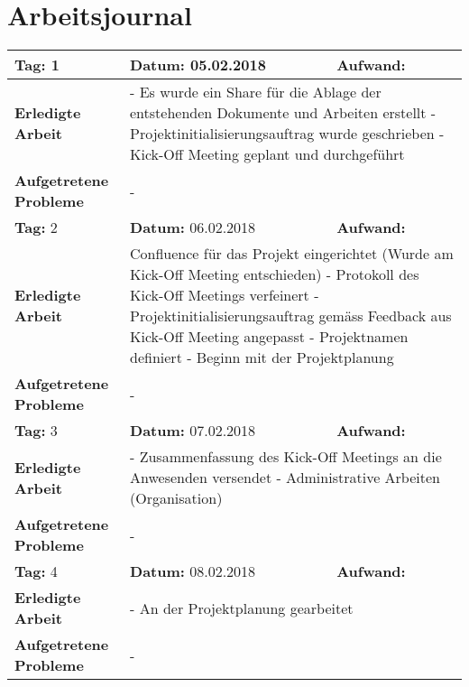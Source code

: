 \section{Arbeitsjournal}
\begin{longtable}{|p{5cm}|p{5cm}|p{6cm}|}
\hline
\rowcolor{heading}\textbf{Tag:} 1 & \textbf{Datum:} 05.02.2018 & \textbf{Aufwand:} \\ \hline
\textbf{Erledigte Arbeit} & \multicolumn{2}{p{11cm}|}{- Es wurde ein Share für die Ablage der entstehenden Dokumente und Arbeiten erstellt \newline
- Projektinitialisierungsauftrag wurde geschrieben \newline
- Kick-Off Meeting geplant und durchgeführt} \\ \hline
\textbf{Aufgetretene Probleme} & \multicolumn{2}{p{11cm}|}{-} \\ \hline
\rowcolor{heading}\textbf{Tag:} 2 & \textbf{Datum:} 06.02.2018 & \textbf{Aufwand:} \\ \hline
\textbf{Erledigte Arbeit} & \multicolumn{2}{p{11cm}|}{Confluence für das Projekt eingerichtet (Wurde am Kick-Off Meeting entschieden) \newline
- Protokoll des Kick-Off Meetings verfeinert \newline
- Projektinitialisierungsauftrag gemäss Feedback aus Kick-Off Meeting angepasst \newline
- Projektnamen definiert \newline
- Beginn mit der Projektplanung} \\ \hline
\textbf{Aufgetretene Probleme} & \multicolumn{2}{p{11cm}|}{-} \\ \hline
\rowcolor{heading}\textbf{Tag:} 3 & \textbf{Datum:} 07.02.2018 & \textbf{Aufwand:} \\ \hline
\textbf{Erledigte Arbeit} & \multicolumn{2}{p{11cm}|}{- Zusammenfassung des Kick-Off Meetings an die Anwesenden versendet \newline
- Administrative Arbeiten (Organisation)} \\ \hline
\textbf{Aufgetretene Probleme} & \multicolumn{2}{p{11cm}|}{-} \\ \hline
\rowcolor{heading}\textbf{Tag:} 4 & \textbf{Datum:} 08.02.2018 & \textbf{Aufwand:} \\ \hline
\textbf{Erledigte Arbeit} & \multicolumn{2}{p{11cm}|}{- An der Projektplanung gearbeitet} \\ \hline
\textbf{Aufgetretene Probleme} & \multicolumn{2}{p{11cm}|}{-} \\ \hline

\end{longtable}
